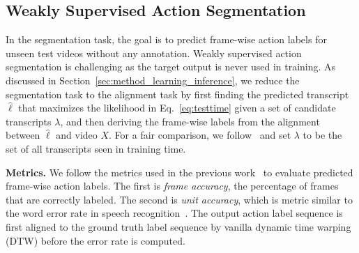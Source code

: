 \documentclass[10pt,twocolumn,letterpaper]{article}
\newcommand{\eqnref}[1]{{Eq.\ \eqref{eq:#1}}}
\begin{document}
\subsection{Weakly Supervised Action Segmentation}

In the segmentation task, the goal is to predict frame-wise action labels for unseen test videos without any annotation. Weakly supervised action segmentation is challenging as the target output is never used in training.
As discussed in Section~\ref{sec:method_learning_inference}, we reduce the segmentation task to the alignment task by first finding the predicted transcript $\hat \ell$ that maximizes the likelihood in \eqnref{testtime} given a set of candidate transcripts $\lambda$, and then deriving the frame-wise labels from the alignment between $\hat \ell$ and video $X$. For a fair comparison, we follow~\cite{richard2018neuralnetwork} and set $\lambda$ to be the set of all transcripts seen in training time. 



{\noindent \bf  Metrics.} 
We follow the metrics used in the previous work~\cite{kuehne2014language} to evaluate predicted frame-wise action labels. The first is \emph{frame accuracy}, the percentage of frames that are correctly labeled. The second is \emph{unit accuracy}, which is metric similar to the word error rate in speech recognition~\cite{klakow2002testing}. The output action label sequence is first aligned to the ground truth label sequence by vanilla dynamic time warping (DTW) before the error rate is computed. 
\end{document}
